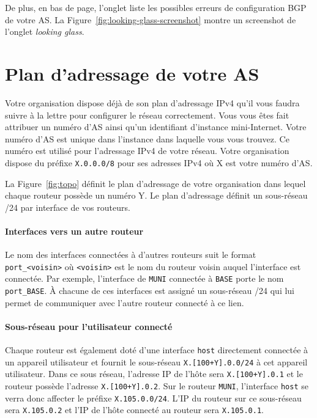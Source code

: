 \documentclass[a4paper, 11pt]{article}
\begin{document}
De plus, en bas de page, l'onglet liste les possibles erreurs de configuration
BGP de votre AS. La Figure~\ref{fig:looking-glass-screenshot} montre un
screenshot de l'onglet \textit{looking glass}.


\section{Plan d'adressage de votre AS}\label{sec:plan-adressage}

Votre organisation dispose déjà de son plan d'adressage IPv4 qu'il
vous faudra suivre à la lettre pour configurer le réseau correctement.
Vous vous êtes fait attribuer un numéro d'AS ainsi qu'un identifiant
d'instance mini-Internet. Votre numéro d'AS est unique dans l'instance
dans laquelle vous vous trouvez. Ce numéro est utilisé pour l'adressage
IPv4 de votre réseau. Votre organisation dispose du préfixe
\texttt{X.0.0.0/8} pour ses adresses IPv4 où X est votre numéro d'AS.

La Figure~\ref{fig:topo} définit le plan d'adressage de votre organisation
dans lequel chaque routeur possède un numéro Y. Le plan d'adressage
définit un sous-réseau /24 par interface de vos routeurs.

\paragraph*{Interfaces vers un autre routeur}
Le nom des interfaces
connectées à d'autres routeurs suit le format \texttt{port\_<voisin>}
où \texttt{<voisin>} est le nom du routeur voisin auquel l'interface
est connectée. Par exemple, l'interface de \texttt{MUNI} connectée à
\texttt{BASE} porte le nom \texttt{port\_BASE}.
À chacune de ces interfaces est assigné un sous-réseau /24 qui lui permet
de communiquer avec l'autre routeur connecté à ce lien.

\paragraph*{Sous-réseau pour l'utilisateur connecté}
Chaque routeur est également doté d'une interface \texttt{host}
directement connectée
à un appareil utilisateur et fournit le sous-réseau
\texttt{X.[100+Y].0.0/24} à cet appareil utilisateur.
Dans ce sous réseau, l'adresse IP de l'hôte sera \texttt{X.[100+Y].0.1}
et le routeur possède l'adresse \texttt{X.[100+Y].0.2}. Sur le routeur
\texttt{MUNI}, l'interface \texttt{host} se verra donc affecter
le préfixe \texttt{X.105.0.0/24}. L'IP du routeur sur ce sous-réseau
sera \texttt{X.105.0.2} et l'IP de l'hôte connecté au routeur
sera \texttt{X.105.0.1}.
\end{document}
